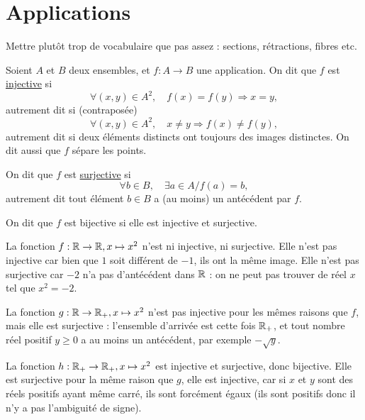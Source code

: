 \chapter{Applications}


Mettre plutôt trop de vocabulaire que pas assez : sections, rétractions, fibres etc.

\begin{definition}\end{definition}
\begin{definition}Soient $A$ et $B$ deux ensembles, et $f : A \to B$ une application. On dit que $f$ est \underline{injective} si
\[\forall (x,y) \in A^2,\quad f(x)=f(y) \Rightarrow  x=y,\]
autrement dit si (contraposée) 
\[\forall (x,y) \in A^2,\quad x\neq y \Rightarrow  f(x)\neq f(y),\]
autrement dit si deux éléments distincts ont toujours des images distinctes. On dit aussi que $f$ \og sépare les points\fg.\end{definition}
\begin{definition}
On dit que $f$ est \underline{surjective} si
\[\forall b \in B,\quad \exists a\in A / f(a)=b,\]
autrement dit tout élément $b\in B$ a (au moins) un antécédent par $f$.
\end{definition}
\begin{definition}
On dit que $f$ est bijective si elle est injective et surjective.
\end{definition}

\begin{exemple}La fonction $f : \mathbb{R} \to \mathbb{R}, x\mapsto x^2$ n'est ni injective, ni surjective. Elle n'est pas injective car bien que $1$ soit différent de $-1$, ils ont la même image. Elle n'est pas surjective car $-2$ n'a pas d'antécédent dans $\mathbb{R}$ : on ne peut pas trouver de réel $x$ tel que $x^2 = -2$.\end{exemple}

\begin{exemple} La fonction $g : \mathbb{R} \to \mathbb{R}_+, x\mapsto x^2$ n'est pas injective pour les mêmes raisons que $f$, mais elle est surjective : l'ensemble d'arrivée est cette fois $\mathbb{R}_+$, et tout nombre réel positif $y\geq 0$ a au moins un antécédent, par exemple $-\sqrt{y}$.
\end{exemple}

\begin{exemple} La fonction $h : \mathbb{R}_+ \to \mathbb{R}_+, x\mapsto x^2$ est injective et surjective, donc bijective. Elle est surjective pour la même raison que $g$, elle est injective, car si $x$ et $y$ sont des réels positifs ayant même carré, ils sont forcément égaux (ils sont positifs donc il n'y a pas l'ambiguité de signe).
\end{exemple}

